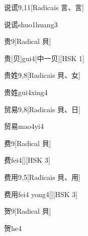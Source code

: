 \begin{entry}{说谎}{9,11}[Radicais ⾔、⾔]
  \begin{phonetics}{说谎}{shuo1huang3}
  \end{phonetics}
\end{entry}

\begin{entry}{贵}{9}[Radical ⾙]
  \begin{phonetics}{贵}[⻉]{gui4}[中一⻉][HSK 1]
  \end{phonetics}
\end{entry}

\begin{entry}{贵姓}{9,8}[Radicais ⾙、⼥]
  \begin{phonetics}{贵姓}{gui4xing4}
  \end{phonetics}
\end{entry}

\begin{entry}{贸易}{9,8}[Radicais ⾙、⽇]
  \begin{phonetics}{贸易}{mao4yi4}
  \end{phonetics}
\end{entry}

\begin{entry}{费}{9}[Radical ⾙]
  \begin{phonetics}{费}{fei4}[][HSK 3]
  \end{phonetics}
\end{entry}

\begin{entry}{费用}{9,5}[Radicais ⾙、⽤]
  \begin{phonetics}{费用}{fei4 yong4}[][HSK 3]
  \end{phonetics}
\end{entry}

\begin{entry}{贺}{9}[Radical ⾙]
  \begin{phonetics}{贺}{he4}
  \end{phonetics}
\end{entry}

